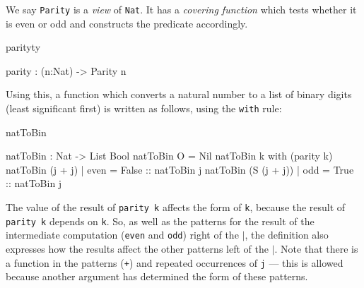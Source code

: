 \noindent
We say \texttt{Parity} is a \emph{view} of \texttt{Nat}. 
It has a \emph{covering function} which tests whether
it is even or odd and constructs the predicate accordingly.

\begin{SaveVerbatim}{parityty}

parity : (n:Nat) -> Parity n

\end{SaveVerbatim}

\noindent
Using this, a function which converts a natural number to a list
of binary digits (least significant first) is written as follows, using the \texttt{with}
rule:

\begin{SaveVerbatim}{natToBin}

natToBin : Nat -> List Bool
natToBin O = Nil
natToBin k with (parity k)
   natToBin (j + j)     | even = False :: natToBin j
   natToBin (S (j + j)) | odd  = True  :: natToBin j

\end{SaveVerbatim}

\noindent
The value of the result of \texttt{parity k} affects the form of \texttt{k}, 
because the result
of \texttt{parity k} depends on \texttt{k}. 
So, as well as the patterns for the result of the
intermediate computation (\texttt{even} and \texttt{odd}) right of the 
\texttt{$\mid$}, the definition also expresses how
the results affect the other patterns left of the $\mid$. Note that there is a
function in the patterns (\texttt{+}) and repeated occurrences of \texttt{j} --- 
this is allowed
because another argument has determined the form of these patterns.


